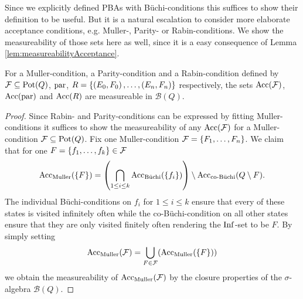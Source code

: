 Since we explicitly defined \acp{PBA} with Büchi-conditions this suffices to
show their definition to be useful. But it is a natural escalation to consider
more elaborate acceptance conditions, e.g. Muller-, Parity- or
Rabin-conditions. We show the measureability of those sets here as well, since
it is a easy consequence of Lemma \ref{lem:measureabilityAcceptance}.
\begin{corollary}
  For a Muller-condition, a Parity-condition and a Rabin-condition
  defined by $\mathcal{F}\subseteq\operatorname{Pot}(Q)$, $\operatorname{par}$, 
  $R = \left\{\left(E_{0}, F_{0}\right),\dots,\left(E_{n}, F_{n}\right)\right\}$ respectively, the 
  sets $\operatorname{Acc}(\mathcal{F})$, $\operatorname{Acc}(\operatorname{par})$ and $\operatorname{Acc}(R)$ are measureable in 
  $\mathcal{B}(Q)$.
  \label{cor:borelAcceptance}
\end{corollary}
\begin{proof}
  Since Rabin- and Parity-conditions can be expressed by fitting 
  Muller-conditions it suffices to show the measureability of any 
  $\operatorname{Acc}(\mathcal{F})$ for a Muller-condition $\mathcal{F}\subseteq\operatorname{Pot}(Q)$.
  Fix one Muller-condition $\mathcal{F} = \left\{F_{1},\dots,F_{n}\right\}$. We claim
  that for one $F = \left\{f_{1},\dots, f_{k}\right\}\in\mathcal{F}$
  \begin{equation*}
    \operatorname{Acc}_{\operatorname{Muller}}(\left\{F\right\}) = \left(
      \bigcap\limits_{1\leq i\leq k}\operatorname{Acc}_{\operatorname{B\ddot{u}chi}}(\left\{f_{i}\right\})\right)\setminus
      \operatorname{Acc}_{\operatorname{co-B\ddot{u}chi}}(Q\setminus F).
  \end{equation*}
  The individual Büchi-conditions on $f_{i}$ for $1\leq i\leq k$ ensure that 
  every of these states is visited infinitely often while the 
  co-Büchi-condition on all other states ensure that they are only visited
  finitely often rendering the $\operatorname{Inf}$-set to be $F$. By simply setting
  \begin{equation*}
    \operatorname{Acc}_{\operatorname{Muller}}(\mathcal{F}) = \bigcup\limits_{F\in\mathcal{F}}(
    \operatorname{Acc}_{\operatorname{Muller}}(\left\{F\right\}))
  \end{equation*}
  we obtain the measureability of $\operatorname{Acc}_{\operatorname{Muller}}(\mathcal{F})$ by the closure
  properties of the $\sigma$-algebra $\mathcal{B}(Q)$.
\end{proof}

